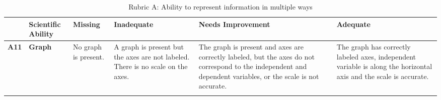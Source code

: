 \begin{landscape}

\begin{longtable}{>{\bfseries}p{0.04\textheight}|>{\bfseries\RaggedRight}p{0.23\textheight}|>{\RaggedRight}p{0.21\textheight}|>{\RaggedRight}p{0.21\textheight}|>{\RaggedRight}p{0.22\textheight}|>{\RaggedRight}p{0.22\textheight}}
	\toprule
	& Scientific Ability
	& Missing & Inadequate & Needs Improvement & Adequate \\ \midrule \endhead
	A11
	& Graph
	& No graph is present.
	& A graph is present but the axes are not labeled. There is no scale on the axes.
	& The graph is present and axes are correctly labeled, but the axes do not correspond to the independent and dependent variables, or the scale is not accurate.
	& The graph has correctly labeled axes, independent variable is along the horizontal axis and the scale is accurate.
	\\
	\bottomrule
	\caption{Rubric A: Ability to represent information in multiple ways}\label{rubric:a}
	\end{longtable}


\end{landscape}
